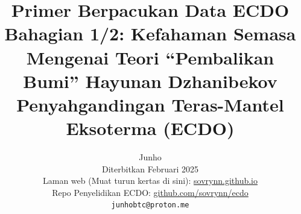 \documentclass[10pt,twocolumn,letterpaper]{article}
\begin{document}
\title{Primer Berpacukan Data ECDO Bahagian 1/2: Kefahaman Semasa Mengenai Teori “Pembalikan Bumi” Hayunan Dzhanibekov Penyahgandingan Teras-Mantel Eksoterma (ECDO)}

\author{Junho\\
Diterbitkan Februari 2025\\
Laman web (Muat turun kertas di sini): \href{https://sovrynn.github.io}{sovrynn.github.io}\\
Repo Penyelidikan ECDO: \href{https://github.com/sovrynn/ecdo}{github.com/sovrynn/ecdo}\\
{\tt\small junhobtc@proton.me}
}
\maketitle
\end{document}
